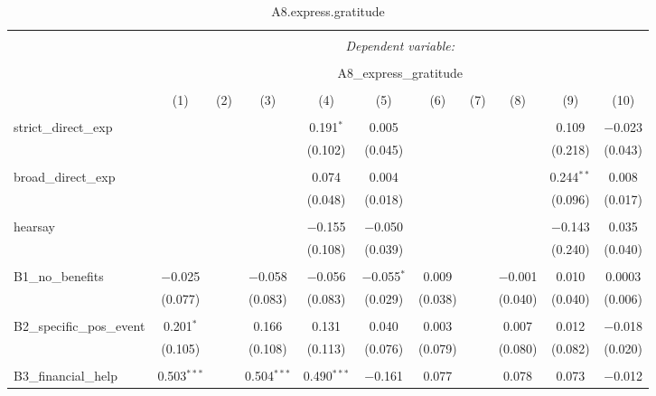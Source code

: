 
\begin{table}[H] \centering 
  \caption{A8.express.gratitude} 
  \label{} 
\tiny 
\begin{tabular}{@{\extracolsep{4pt}}lcccccccccc} 
\\[-1.8ex]\hline 
\hline \\[-1.8ex] 
 & \multicolumn{10}{c}{\textit{Dependent variable:}} \\ 
\cline{2-11} 
\\[-1.8ex] & \multicolumn{10}{c}{A8\_express\_gratitude} \\ 
\\[-1.8ex] & (1) & (2) & (3) & (4) & (5) & (6) & (7) & (8) & (9) & (10)\\ 
\hline \\[-1.8ex] 
 strict\_direct\_exp &  &  &  & 0.191$^{*}$ & 0.005 &  &  &  & 0.109 & $-$0.023 \\ 
  &  &  &  & (0.102) & (0.045) &  &  &  & (0.218) & (0.043) \\ 
  & & & & & & & & & & \\ 
 broad\_direct\_exp &  &  &  & 0.074 & 0.004 &  &  &  & 0.244$^{**}$ & 0.008 \\ 
  &  &  &  & (0.048) & (0.018) &  &  &  & (0.096) & (0.017) \\ 
  & & & & & & & & & & \\ 
 hearsay &  &  &  & $-$0.155 & $-$0.050 &  &  &  & $-$0.143 & 0.035 \\ 
  &  &  &  & (0.108) & (0.039) &  &  &  & (0.240) & (0.040) \\ 
  & & & & & & & & & & \\ 
 B1\_no\_benefits & $-$0.025 &  & $-$0.058 & $-$0.056 & $-$0.055$^{*}$ & 0.009 &  & $-$0.001 & 0.010 & 0.0003 \\ 
  & (0.077) &  & (0.083) & (0.083) & (0.029) & (0.038) &  & (0.040) & (0.040) & (0.006) \\ 
  & & & & & & & & & & \\ 
 B2\_specific\_pos\_event & 0.201$^{*}$ &  & 0.166 & 0.131 & 0.040 & 0.003 &  & 0.007 & 0.012 & $-$0.018 \\ 
  & (0.105) &  & (0.108) & (0.113) & (0.076) & (0.079) &  & (0.080) & (0.082) & (0.020) \\ 
  & & & & & & & & & & \\ 
 B3\_financial\_help & 0.503$^{***}$ &  & 0.504$^{***}$ & 0.490$^{***}$ & $-$0.161 & 0.077 &  & 0.078 & 0.073 & $-$0.012 \\ 

\end{tabular}
\end{table}
